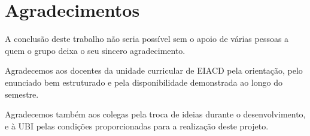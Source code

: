 \chapter*{Agradecimentos}
\label{chap:ack}

A conclusão deste trabalho não seria possível sem o apoio de várias pessoas a quem o grupo deixa o seu sincero agradecimento.

Agradecemos aos docentes da unidade curricular de \ac{EIACD} pela orientação, pelo enunciado bem estruturado e pela disponibilidade demonstrada ao longo do semestre.

Agradecemos também aos colegas pela troca de ideias durante o desenvolvimento, e à \ac{UBI} pelas condições proporcionadas para a realização deste projeto.
